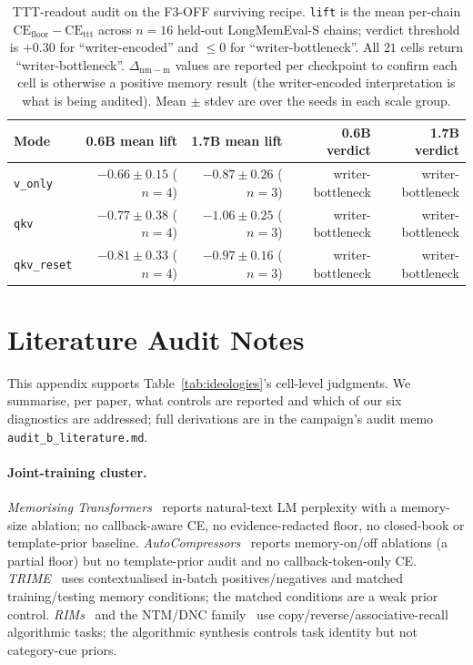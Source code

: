 \documentclass{article}
\newcommand{\dnm}{\Delta_{\mathrm{nm-m}}}
\newcommand{\CEfloor}{\mathrm{CE}_{\mathrm{floor}}}
\begin{document}
\begin{table}[t]
\centering
\caption{TTT-readout audit on the F3-OFF surviving recipe.
\texttt{lift} is the mean per-chain
$\CEfloor - \mathrm{CE}_{\mathrm{ttt}}$ across $n=16$ held-out
LongMemEval-S chains; verdict threshold is $+0.30$ for
``writer-encoded'' and $\le 0$ for ``writer-bottleneck''.  All $21$
cells return ``writer-bottleneck''.  $\dnm$ values are reported per
checkpoint to confirm each cell is otherwise a positive memory
result (the writer-encoded interpretation is what is being audited).
Mean $\pm$ stdev are over the seeds in each scale group.}
\label{tab:ttt_readout}
\small
\begin{tabular}{lrrrr}
\toprule
Mode                  & 0.6B mean lift           & 1.7B mean lift           & 0.6B verdict & 1.7B verdict \\
\midrule
\texttt{v\_only}      & $-0.66 \pm 0.15$ ($n=4$) & $-0.87 \pm 0.26$ ($n=3$) & writer-bottleneck & writer-bottleneck \\
\texttt{qkv}          & $-0.77 \pm 0.38$ ($n=4$) & $-1.06 \pm 0.25$ ($n=3$) & writer-bottleneck & writer-bottleneck \\
\texttt{qkv\_reset}   & $-0.81 \pm 0.33$ ($n=4$) & $-0.97 \pm 0.16$ ($n=3$) & writer-bottleneck & writer-bottleneck \\
\bottomrule
\end{tabular}
\end{table}

\section{Literature Audit Notes}
\label{app:litaudit}

This appendix supports Table~\ref{tab:ideologies}'s cell-level
judgments.  We summarise, per paper, what controls are reported and
which of our six diagnostics are addressed; full derivations are in
the campaign's audit memo \texttt{audit\_b\_literature.md}.

\paragraph{Joint-training cluster.}
\emph{Memorising Transformers}~\cite{memorizing2022} reports
natural-text LM perplexity with a memory-size ablation; no
callback-aware CE, no evidence-redacted floor, no closed-book or
template-prior baseline.  \emph{AutoCompressors}~\cite{autocompressors2023}
reports memory-on/off ablations (a partial floor) but no
template-prior audit and no callback-token-only CE.
\emph{TRIME}~\cite{trime2022} uses contextualised in-batch
positives/negatives and matched training/testing memory conditions;
the matched conditions are a weak prior control.
\emph{RIMs}~\cite{rims2021} and the NTM/DNC family~\cite{ntm2014}
use copy/reverse/associative-recall algorithmic tasks; the
algorithmic synthesis controls task identity but not category-cue
priors.
\end{document}
